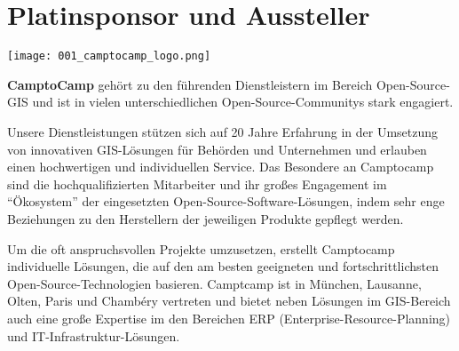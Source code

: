 \section*{Platinsponsor und Aussteller}
  \texttt{[image: 001\_camptocamp\_logo.png]}
  \vspace{1.0\baselineskip}
  
\noindent
{\bfseries CamptoCamp} gehört zu den führenden Dienstleistern im Bereich Open-Source-GIS und ist in vielen unterschiedlichen Open-Source-Communitys stark engagiert.

\noindent
Unsere Dienstleistungen stützen sich auf 20 Jahre Erfahrung in der Umsetzung von innovativen GIS-Lösungen für Behörden und Unternehmen und erlauben einen hochwertigen und individuellen Service. Das Besondere an Camptocamp sind die hochqualifizierten Mitarbeiter und ihr großes Engagement im "`Ökosystem"' der eingesetzten Open-Source-Software-Lösungen, indem sehr enge Beziehungen zu den Herstellern der jeweiligen Produkte gepflegt werden.

\noindent
Um die oft anspruchsvollen Projekte umzusetzen, erstellt Camptocamp individuelle Lösungen, die auf den am besten geeigneten und fortschrittlichsten Open-Source-Technologien basieren. Camptcamp ist in München, Lausanne, Olten, Paris und Chambéry vertreten und bietet neben Lösungen im GIS-Bereich auch eine große Expertise im den Bereichen ERP (Enterprise-Resource-Planning) und IT-Infrastruktur-Lösungen.
